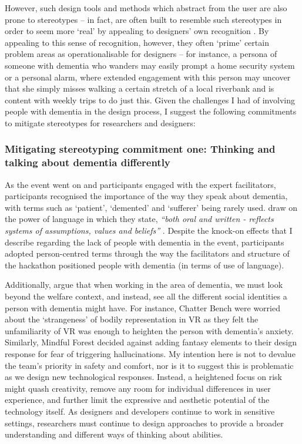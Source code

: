 However, such design tools and methods which abstract from the user are also prone to stereotypes – in fact, are often built to resemble such stereotypes in order to seem more `real' by appealing to designers’ own recognition \citep{cutting_can_2019}. By appealing to this sense of recognition, however, they often `prime' certain problem areas as operationalisable for designers – for instance, a persona of someone with dementia who wanders may easily prompt a home security system or a personal alarm, where extended engagement with this person may uncover that she simply misses walking a certain stretch of a local riverbank and is content with weekly trips to do just this. Given the challenges I had of involving people with dementia in the design process, I suggest the following commitments to mitigate stereotypes for researchers and designers:

\subsubsection{Mitigating stereotyping commitment one: Thinking and talking about dementia differently}
\label{DiscussionOne:CommitTwo}
As the event went on and participants engaged with the expert facilitators, participants recognised the importance of the way they speak about dementia, with terms such as `patient', `demented' and `sufferer' being rarely used. \cite{bartlett2010broadening} draw on the power of language in which they state, \textit{``both oral and written - reflects systems of assumptions, values and beliefs''} \citep[pg.52]{bartlett2010broadening}. Despite the knock-on effects that I describe regarding the lack of people with dementia in the event, participants adopted person-centred terms through the way the facilitators and structure of the hackathon positioned people with dementia (in terms of use of language).

Additionally, \cite{bartlett2010broadening} argue that when working in the area of dementia, we must look beyond the welfare context, and instead, see all the different social identities a person with dementia might have. For instance, Chatter Bench were worried about the `strangeness' of bodily representation in VR as they felt the unfamiliarity of VR was enough to heighten the person with dementia's anxiety. Similarly, Mindful Forest decided against adding fantasy elements to their design response for fear of triggering hallucinations. My intention here is not to devalue the team's priority in safety and comfort, nor is it to suggest this is problematic as we design new technological responses. Instead, a heightened focus on risk might quash creativity, remove any room for individual differences in user experience, and further limit the expressive and aesthetic potential of the technology itself. As designers and developers continue to work in sensitive settings, researchers must continue to design approaches to provide a broader understanding and different ways of thinking about abilities. 

